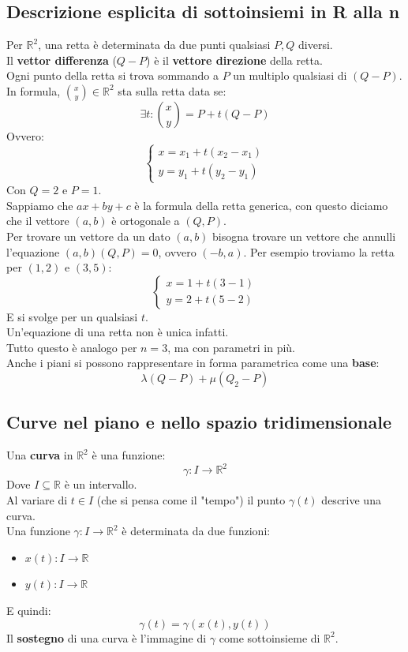 \documentclass[12pt,a4paper]{article}
\begin{document}
\subsection{Descrizione esplicita di sottoinsiemi in R alla n}
Per $\mathbb{R}^2$, una retta è determinata da due punti qualsiasi $P,Q$ diversi.\\
Il \textbf{vettor differenza} ($Q - P$) è il \textbf{vettore direzione} della retta.\\
Ogni punto della retta si trova sommando a $P$ un multiplo qualsiasi di $(Q-P)$.\\
In formula, $\binom{x}{y} \in \mathbb{R}^2$ sta sulla retta data se:
\[
\exists t : \binom{x}{y} = P + t(Q-P)
\]
Ovvero:
\[
\begin{cases}
  x = x_1 + t(x_2 - x_1)\\
  y = y_1 + t(y_2 - y_1)
\end{cases}
\]
Con $Q = 2$ e $P = 1$.\\
Sappiamo che $ax + by + c$ è la formula della retta generica, con questo diciamo che il vettore $(a,b)$ è ortogonale a $(Q,P)$.\\
Per trovare un vettore da un dato $(a,b)$ bisogna trovare un vettore che annulli l'equazione $(a,b)(Q,P) = 0$, ovvero $(-b,a)$. Per esempio troviamo la retta per $(1,2)$ e $(3,5)$:
\[
\begin{cases}
  x = 1 + t(3 - 1) \\
  y = 2 + t(5 - 2)
\end{cases}
\]
E si svolge per un qualsiasi $t$.\\
Un'equazione di una retta non è unica infatti.\\
Tutto questo è analogo per $n=3$, ma con parametri in più.\\
Anche i piani si possono rappresentare in forma parametrica come una \textbf{base}:
\[
\lambda(Q - P) + \mu(Q_2 - P)
\]
\subsection{Curve nel piano e nello spazio tridimensionale}
Una \textbf{curva} in $\mathbb{R}^2$ è una funzione:
\[
\gamma : I \to \mathbb{R}^2
\]
Dove $I \subseteq \mathbb{R}$ è un intervallo.\\
Al variare di $t \in I$ (che si pensa come il "tempo") il punto $\gamma(t)$ descrive una curva.\\
Una funzione $\gamma: I \to \mathbb{R}^2$ è determinata da due funzioni:
\begin{itemize}
  \item $x(t): I \to \mathbb{R}$
  \item $y(t): I \to \mathbb{R}$
\end{itemize}
E quindi:
\[
\gamma(t) = \gamma(x(t),y(t))
\]
Il \textbf{sostegno} di una curva è l'immagine di $\gamma$ come sottoinsieme di $\mathbb{R}^2$.
\end{document}
